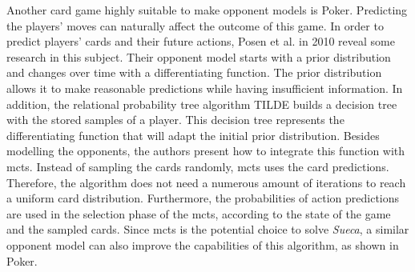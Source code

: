 Another card game highly suitable to make opponent models is Poker.
Predicting the players' moves can naturally affect the outcome of this game.
In order to predict players' cards and their future actions, Posen et al. in 2010 \cite{Ponsen2008} reveal some research in this subject.
Their opponent model starts with a prior distribution and changes over time with a differentiating function.
The prior distribution allows it to make reasonable predictions while having insufficient information.
In addition, the relational probability tree algorithm TILDE builds a decision tree with the stored samples of a player.
This decision tree represents the differentiating function that will adapt the initial prior distribution.
Besides modelling the opponents, the authors present how to integrate this function with \gls{mcts}.
Instead of sampling the cards randomly, \gls{mcts} uses the card predictions.
Therefore, the algorithm does not need a numerous amount of iterations to reach a uniform card distribution.
Furthermore, the probabilities of action predictions are used in the selection phase of the \gls{mcts}, according to the state of the game and the sampled cards.
Since \gls{mcts} is the potential choice to solve \emph{Sueca}, a similar opponent model can also improve the capabilities of this algorithm, as shown in Poker.

 